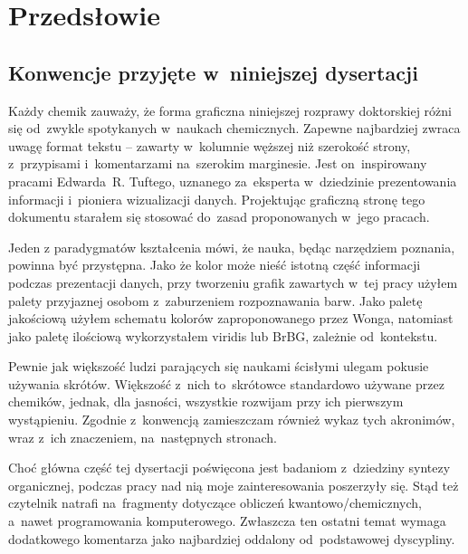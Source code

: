 \chapter{Przedsłowie}\label{chapter:intro}

\section{Konwencje przyjęte w~niniejszej dysertacji}\label{intro:conventions}

Każdy chemik zauważy, że forma graficzna niniejszej rozprawy doktorskiej różni się
  od~zwykle spotykanych w~naukach chemicznych.
Zapewne najbardziej zwraca uwagę format tekstu \--- zawarty w~kolumnie węższej niż
  szerokość strony, z~przypisami i~komentarzami na~szerokim marginesie.
Jest on~inspirowany pracami Edwarda~R. Tuftego,
  uznanego za~eksperta w~dziedzinie prezentowania informacji i~pioniera wizualizacji
  danych.
Projektując graficzną stronę tego dokumentu starałem się stosować do~zasad
  proponowanych w~jego pracach.

Jeden z paradygmatów kształcenia mówi, że nauka, będąc narzędziem poznania,
  powinna być przystępna.
Jako że kolor może nieść istotną część informacji podczas prezentacji danych,
  przy tworzeniu grafik zawartych w~tej pracy użyłem palety przyjaznej osobom
  z~zaburzeniem rozpoznawania barw.
Jako paletę jakościową użyłem schematu kolorów zaproponowanego przez Wonga,
  natomiast jako paletę ilościową wykorzystałem viridis lub BrBG,
  zależnie od~kontekstu.

Pewnie jak większość ludzi parających się naukami ścisłymi ulegam pokusie używania skrótów.
Większość z~nich to~skrótowce standardowo używane przez chemików,
  jednak, dla jasności, wszystkie rozwijam przy ich pierwszym wystąpieniu.
Zgodnie z~konwencją zamieszczam również wykaz tych akronimów,
  wraz z~ich znaczeniem, na~następnych stronach.

Choć główna część tej dysertacji poświęcona jest badaniom z~dziedziny syntezy organicznej,
  podczas pracy nad nią moje zainteresowania poszerzyły się.
Stąd też czytelnik natrafi na~fragmenty dotyczące obliczeń kwantowo\-/chemicznych,
  a~nawet programowania komputerowego.
Zwłaszcza ten ostatni temat wymaga dodatkowego komentarza jako najbardziej oddalony
  od~podstawowej dyscypliny.

